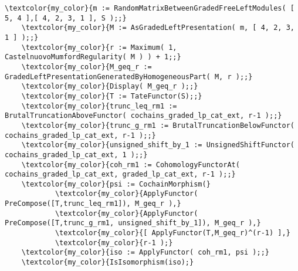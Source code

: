 \documentclass[16pt,a4paper]{extarticle}
\theoremstyle{definition}
\theoremstyle{theorem}
\begin{document}
\begin{Verbatim}[commandchars=\\\{\}, fontseries=b, frame=single, label=Gap Code, framerule=0.5mm, rulecolor=\color{rule_color} ]
    \textcolor{my_color}{m := RandomMatrixBetweenGradedFreeLeftModules( [ 5, 4 ],[ 4, 2, 3, 1 ], S );;}
    \textcolor{my_color}{M := AsGradedLeftPresentation( m, [ 4, 2, 3, 1 ] );;}
    \textcolor{my_color}{r := Maximum( 1, CastelnuovoMumfordRegularity( M ) ) + 1;;}
    \textcolor{my_color}{M_geq_r := GradedLeftPresentationGeneratedByHomogeneousPart( M, r );;}
    \textcolor{my_color}{Display( M_geq_r );;}
    \textcolor{my_color}{T := TateFunctor(S);;}
    \textcolor{my_color}{trunc_leq_rm1 := BrutalTruncationAboveFunctor( cochains_graded_lp_cat_ext, r-1 );;}
    \textcolor{my_color}{trunc_g_rm1 := BrutalTruncationBelowFunctor( cochains_graded_lp_cat_ext, r-1 );;}
    \textcolor{my_color}{unsigned_shift_by_1 := UnsignedShiftFunctor( cochains_graded_lp_cat_ext, 1 );;}
    \textcolor{my_color}{coh_rm1 := CohomologyFunctorAt( cochains_graded_lp_cat_ext, graded_lp_cat_ext, r-1 );;}
    \textcolor{my_color}{psi := CochainMorphism(}
            \textcolor{my_color}{ApplyFunctor( PreCompose([T,trunc_leq_rm1]), M_geq_r ),}
            \textcolor{my_color}{ApplyFunctor( PreCompose([T,trunc_g_rm1, unsigned_shift_by_1]), M_geq_r ),}
            \textcolor{my_color}{[ ApplyFunctor(T,M_geq_r)^(r-1) ],}
            \textcolor{my_color}{r-1 );}
    \textcolor{my_color}{iso := ApplyFunctor( coh_rm1, psi );;}
    \textcolor{my_color}{IsIsomorphism(iso);}
\end{Verbatim}
\end{document}
